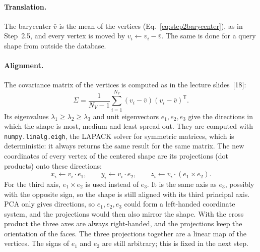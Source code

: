 \documentclass[10pt,a4paper]{article}
\begin{document}
\paragraph{Translation.}
The barycenter $\bar v$ is the mean of the vertices (Eq.~\eqref{eq:step2barycenter}), as in Step~2.5, and every vertex is moved
by $v_i\leftarrow v_i-\bar v$. The same is done for a query shape from outside the database.

\paragraph{Alignment.}
The covariance matrix of the vertices is computed as in the lecture slides~[18]:
\begin{equation}
  \Sigma=\frac1{N_V-1}\sum_{i=1}^{N_V}(v_i-\bar v)(v_i-\bar v)^{\mathsf T}.
  \label{eq:covariance}
\end{equation}
Its eigenvalues $\lambda_1\ge\lambda_2\ge\lambda_3$ and unit eigenvectors $e_1,e_2,e_3$ give the directions in which the
shape is most, medium and least spread out. They are computed with \texttt{numpy.linalg.eigh}, the LAPACK solver for symmetric
matrices, which is deterministic: it always returns the same result for the same matrix. The new coordinates of every vertex of the centered shape are
its projections (dot products) onto these directions:
\begin{equation}
  x_i\leftarrow v_i\cdot e_1,\qquad y_i\leftarrow v_i\cdot e_2,\qquad z_i\leftarrow v_i\cdot(e_1\times e_2).
  \label{eq:alignment}
\end{equation}
For the third axis, $e_1\times e_2$ is used instead of $e_3$. It is the same axis as $e_3$, possibly with the opposite sign,
so the shape is still aligned with its third principal axis. PCA only gives directions, so $e_1,e_2,e_3$ could form a
left-handed coordinate system, and the projections would then also mirror the shape. With the cross product the three axes are
always right-handed, and the projections keep the orientation of the faces. The three projections together are a linear map
of the vertices. The signs of $e_1$ and $e_2$ are still arbitrary; this is fixed in the next step.
\end{document}
